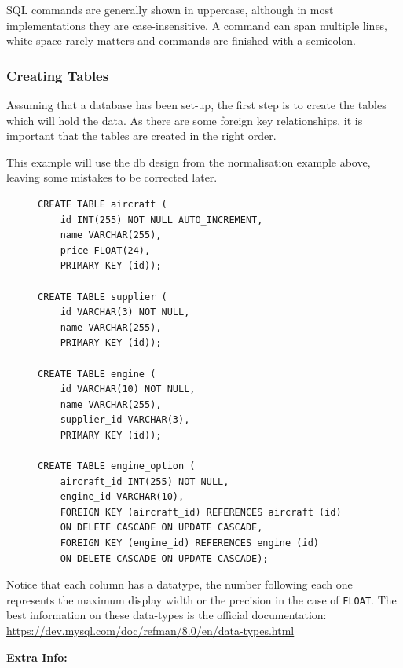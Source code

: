 \documentclass[9pt]{article}
\begin{document}
SQL commands are generally shown in uppercase, although in most implementations they are case-insensitive. A command can span multiple lines, white-space rarely matters and commands are finished with a semicolon.

\subsubsection{Creating Tables}
\label{sec:org9c3ac21}

Assuming that a database has been set-up, the first step is to create the tables which will hold the data. As there are some foreign key relationships, it is important that the tables are created in the right order.

This example will use the db design from the normalisation example above, leaving some mistakes to be corrected later.

\begin{figure}[H]
\begin{verbatim}
CREATE TABLE aircraft (
    id INT(255) NOT NULL AUTO_INCREMENT,
    name VARCHAR(255),
    price FLOAT(24),
    PRIMARY KEY (id));

CREATE TABLE supplier (
    id VARCHAR(3) NOT NULL,
    name VARCHAR(255),
    PRIMARY KEY (id));

CREATE TABLE engine (
    id VARCHAR(10) NOT NULL,
    name VARCHAR(255),
    supplier_id VARCHAR(3),
    PRIMARY KEY (id));

CREATE TABLE engine_option (
    aircraft_id INT(255) NOT NULL,
    engine_id VARCHAR(10),
    FOREIGN KEY (aircraft_id) REFERENCES aircraft (id)
    ON DELETE CASCADE ON UPDATE CASCADE,
    FOREIGN KEY (engine_id) REFERENCES engine (id)
    ON DELETE CASCADE ON UPDATE CASCADE);
\end{verbatim}
\end{figure}

Notice that each column has a datatype, the number following each one represents the maximum display width or the precision in the case of \texttt{FLOAT}. The best information on these data-types is the official documentation: \url{https://dev.mysql.com/doc/refman/8.0/en/data-types.html}

\textbf{Extra Info:}
\end{document}
